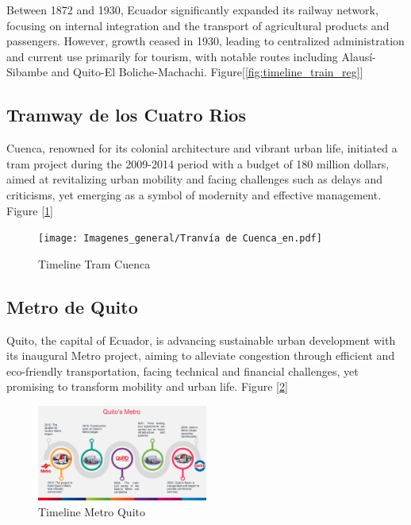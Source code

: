 \documentclass[conference]{IEEEtran}
\begin{document}
Between 1872 and 1930, Ecuador significantly expanded its railway network, focusing on internal integration and the transport of agricultural products and passengers. However, growth ceased in 1930, leading to centralized administration and current use primarily for tourism, with notable routes including Alausí-Sibambe and Quito-El Boliche-Machachi. Figure[\ref{fig:timeline_train_reg}]


\subsection{Tramway de los Cuatro Rios}

Cuenca, renowned for its colonial architecture and vibrant urban life, initiated a tram project during the 2009-2014 period with a budget of 180 million dollars, aimed at revitalizing urban mobility and facing challenges such as delays and criticisms, yet emerging as a symbol of modernity and effective management. Figure [\ref{fig:timeline_train_cu}]

\begin{figure}[ht]
    \centering
    \texttt{[image: Imagenes\_general/Tranvía de Cuenca\_en.pdf]}
    \caption{Timeline Tram Cuenca}
    \label{fig:timeline_train_cu}
\end{figure}

\subsection{Metro de Quito}

Quito, the capital of Ecuador, is advancing sustainable urban development with its inaugural Metro project, aiming to alleviate congestion through efficient and eco-friendly transportation, facing technical and financial challenges, yet promising to transform mobility and urban life. Figure [\ref{Timeline Metro Quito}]

\begin{figure}[ht]                                     
    \centerline{\includegraphics[width=0.5\textwidth, scale=0.50]{Imagenes_general/Metro de Quito_en.pdf}}
    \caption{Timeline Metro Quito}                     
    \label{Timeline Metro Quito}                                                 
\end{figure} 
\end{document}
